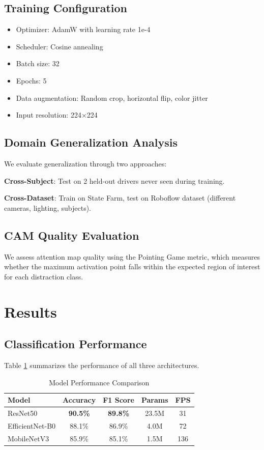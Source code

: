 \documentclass[conference]{IEEEtran}
\begin{document}
\subsection{Training Configuration}

\begin{itemize}
    \item Optimizer: AdamW with learning rate 1e-4
    \item Scheduler: Cosine annealing
    \item Batch size: 32
    \item Epochs: 5
    \item Data augmentation: Random crop, horizontal flip, color jitter
    \item Input resolution: 224×224
\end{itemize}

\subsection{Domain Generalization Analysis}

We evaluate generalization through two approaches:

\textbf{Cross-Subject}: Test on 2 held-out drivers never seen during training.

\textbf{Cross-Dataset}: Train on State Farm, test on Roboflow dataset (different cameras, lighting, subjects).

\subsection{CAM Quality Evaluation}

We assess attention map quality using the Pointing Game metric, which measures whether the maximum activation point falls within the expected region of interest for each distraction class.

\section{Results}

\subsection{Classification Performance}

Table \ref{tab:results} summarizes the performance of all three architectures.

\begin{table}[h]
\centering
\caption{Model Performance Comparison}
\label{tab:results}
\begin{tabular}{lcccc}
\toprule
Model & Accuracy & F1 Score & Params & FPS \\
\midrule
ResNet50 & \textbf{90.5\%} & \textbf{89.8\%} & 23.5M & 31 \\
EfficientNet-B0 & 88.1\% & 86.9\% & 4.0M & 72 \\
MobileNetV3 & 85.9\% & 85.1\% & 1.5M & 136 \\
\bottomrule
\end{tabular}
\end{table}
\end{document}
